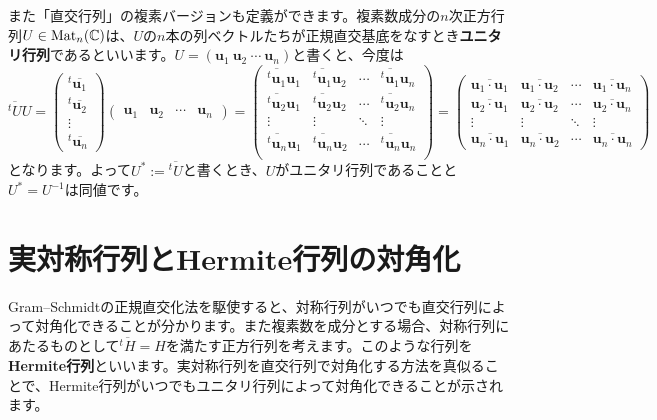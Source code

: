 また「直交行列」の複素バージョンも定義ができます。複素数成分の$n$次正方行列$U \in \operatorname{Mat}_n(\mathbb{C})$は、$U$の$n$本の列ベクトルたちが正規直交基底をなすとき\textbf{ユニタリ行列}であるといいます。$U = (\bm{u}_1 \ \bm{u}_2 \ \cdots \ \bm{u}_n)$と書くと、今度は
\[
\overline{{}^t U} U = 
\begin{pmatrix}
{}^t\overline{\bm{u}_1} \\
{}^t\overline{\bm{u}_2} \\
\vdots \\
{}^t\overline{\bm{u}_n}
\end{pmatrix}
\begin{pmatrix}
\bm{u}_1 & \bm{u}_2 & \cdots & \bm{u}_n
\end{pmatrix}
= 
\begin{pmatrix}
\overline{{}^t\bm{u}_1} \bm{u}_1 & \overline{{}^t\bm{u}_1} \bm{u}_2 & \cdots & \overline{{}^t \bm{u}_1} \bm{u}_n \\
\overline{{}^t\bm{u}_2} \bm{u}_1 & \overline{{}^t\bm{u}_2} \bm{u}_2 & \cdots & \overline{{}^t \bm{u}_2} \bm{u}_n \\
\vdots & \vdots & \ddots & \vdots \\
\overline{{}^t\bm{u}_n} \bm{u}_1 & \overline{{}^t\bm{u}_n} \bm{u}_2 & \cdots & \overline{{}^t \bm{u}_n} \bm{u}_n \\
\end{pmatrix}
=
\begin{pmatrix}
\overline{\bm{u}_1 \cdot \bm{u}_1} & \overline{\bm{u}_1 \cdot \bm{u}_2} & \cdots & \overline{\bm{u}_1 \cdot \bm{u}_n} \\
\overline{\bm{u}_2 \cdot \bm{u}_1} & \overline{\bm{u}_2 \cdot \bm{u}_2} & \cdots & \overline{\bm{u}_2 \cdot \bm{u}_n} \\
\vdots & \vdots & \ddots & \vdots \\
\overline{\bm{u}_n \cdot \bm{u}_1} & \overline{\bm{u}_n \cdot \bm{u}_2} & \cdots & \overline{\bm{u}_n \cdot \bm{u}_n}
\end{pmatrix}
\]
となります。よって$U^* := \overline{{}^t U}$と書くとき、$U$がユニタリ行列であることと$U^* = U^{-1}$は同値です。


\section{実対称行列とHermite行列の対角化}

Gram--Schmidtの正規直交化法を駆使すると、対称行列がいつでも直交行列によって対角化できることが分かります。また複素数を成分とする場合、対称行列にあたるものとして$\overline{{}^tH} = H$を満たす正方行列を考えます。このような行列を\textbf{Hermite行列}といいます。実対称行列を直交行列で対角化する方法を真似ることで、Hermite行列がいつでもユニタリ行列によって対角化できることが示されます。


